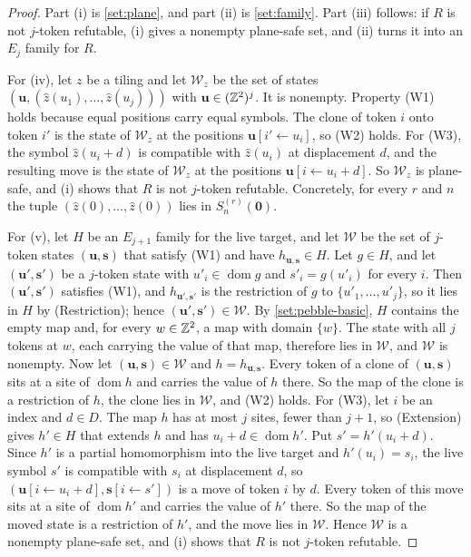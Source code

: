 \begin{proof}
Part (i) is \cref{set:plane}, and part (ii) is \cref{set:family}. Part (iii) follows: if $R$ is not $j$-token refutable, (i) gives a nonempty plane-safe set, and (ii) turns it into an $E_j$ family for $R$.

For (iv), let $z$ be a tiling and let $\mathcal W_z$ be the set of states $(\mathbf u,(\hat z(u_1),\dots,\hat z(u_j)))$ with $\mathbf u\in(\mathbb{Z}^2)^j$. It is nonempty. Property (W1) holds because equal positions carry equal symbols. The clone of token $i$ onto token $i'$ is the state of $\mathcal W_z$ at the positions $\mathbf u[i'\leftarrow u_i]$, so (W2) holds. For (W3), the symbol $\hat z(u_i+d)$ is compatible with $\hat z(u_i)$ at displacement $d$, and the resulting move is the state of $\mathcal W_z$ at the positions $\mathbf u[i\leftarrow u_i+d]$. So $\mathcal W_z$ is plane-safe, and (i) shows that $R$ is not $j$-token refutable. Concretely, for every $r$ and $n$ the tuple $(\hat z(0),\dots,\hat z(0))$ lies in $S^{(r)}_n(\mathbf 0)$.

For (v), let $H$ be an $E_{j+1}$ family for the live target, and let $\mathcal W$ be the set of $j$-token states $(\mathbf u,\mathbf s)$ that satisfy (W1) and have $h_{\mathbf u,\mathbf s}\in H$. Let $g\in H$, and let $(\mathbf u',\mathbf s')$ be a $j$-token state with $u'_i\in\operatorname{dom}g$ and $s'_i=g(u'_i)$ for every $i$. Then $(\mathbf u',\mathbf s')$ satisfies (W1), and $h_{\mathbf u',\mathbf s'}$ is the restriction of $g$ to $\{u'_1,\dots,u'_j\}$, so it lies in $H$ by (Restriction); hence $(\mathbf u',\mathbf s')\in\mathcal W$. By \cref{set:pebble-basic}, $H$ contains the empty map and, for every $w\in\mathbb{Z}^2$, a map with domain $\{w\}$. The state with all $j$ tokens at $w$, each carrying the value of that map, therefore lies in $\mathcal W$, and $\mathcal W$ is nonempty. Now let $(\mathbf u,\mathbf s)\in\mathcal W$ and $h=h_{\mathbf u,\mathbf s}$. Every token of a clone of $(\mathbf u,\mathbf s)$ sits at a site of $\operatorname{dom}h$ and carries the value of $h$ there. So the map of the clone is a restriction of $h$, the clone lies in $\mathcal W$, and (W2) holds. For (W3), let $i$ be an index and $d\in D$. The map $h$ has at most $j$ sites, fewer than $j+1$, so (Extension) gives $h'\in H$ that extends $h$ and has $u_i+d\in\operatorname{dom}h'$. Put $s'=h'(u_i+d)$. Since $h'$ is a partial homomorphism into the live target and $h'(u_i)=s_i$, the live symbol $s'$ is compatible with $s_i$ at displacement $d$, so $(\mathbf u[i\leftarrow u_i+d],\mathbf s[i\leftarrow s'])$ is a move of token $i$ by $d$. Every token of this move sits at a site of $\operatorname{dom}h'$ and carries the value of $h'$ there. So the map of the moved state is a restriction of $h'$, and the move lies in $\mathcal W$. Hence $\mathcal W$ is a nonempty plane-safe set, and (i) shows that $R$ is not $j$-token refutable.
\end{proof}

